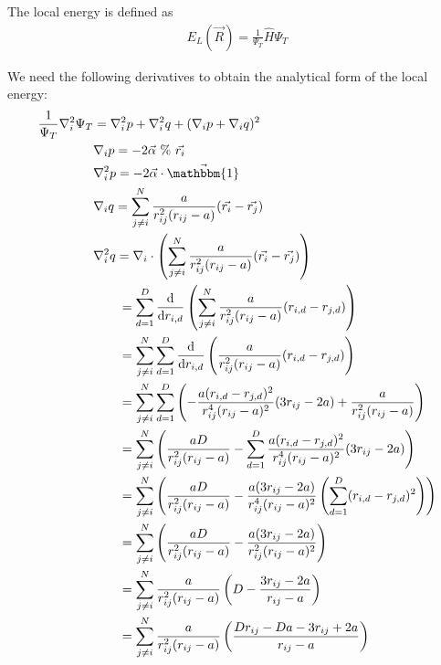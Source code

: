 \documentclass[12pt]{article}
\begin{document}
\noindent The local energy is defined as
\begin{align}
E_L(\vec{R}) = \frac{1}{\Psi_T}\hat{H}\Psi_T 
\end{align}

\noindent We need the following derivatives to obtain the analytical form of the local energy:
\begin{align*}
\frac{1}{\Psi_T}\nabla_i^2 \Psi_T &= \nabla_i^2 p + \nabla_i^2 q + (\nabla_i p + \nabla_i q)^2\\
&\nabla_i p = -2 \vec{\alpha} \ \% \ \vec{r_i}\\
&\nabla_i^2 p = -2 \vec{\alpha} \cdot \vec{\mathbbm{1}}\\
&\nabla_i q = \sum_{j \neq i}^N \frac{a}{r_{ij}^2(r_{ij}-a) }(\vec{r_i}-\vec{r_j})\\
&\nabla_i^2 q = \nabla_i \cdot \left( \sum_{j \neq i}^N \frac{a}{r_{ij}^2(r_{ij}-a)} (\vec{r_i}-\vec{r_j}) \right) \\
& \hspace*{7mm} = \sum_{d=1}^D \frac{\text{d}}{\text{d}r_{i,d}} \left( \sum_{j \neq i}^N \frac{a}{r_{ij}^2(r_{ij}-a) }(r_{i,d}-r_{j,d}) \right) \\
& \hspace*{7mm} = \sum_{j\neq i}^N \sum_{d=1}^D \frac{\text{d}}{\text{d}r_{i,d}} \left( \frac{a}{r_{ij}^2(r_{ij}-a) }(r_{i,d}-r_{j,d}) \right) \\
& \hspace*{7mm} = \sum_{j\neq i}^N \sum_{d=1}^D  \left( -\frac{a(r_{i,d}-r_{j,d})^2}{r_{ij}^4(r_{ij}-a)^2} (3r_{ij}-2a) + \frac{a}{r_{ij}^2(r_{ij}-a)}\right) \\
& \hspace*{7mm} = \sum_{j\neq i}^N \left( \frac{aD}{r_{ij}^2(r_{ij}-a)} -\sum_{d=1}^D 
\frac{a(r_{i,d}-r_{j,d})^2}{r_{ij}^4(r_{ij}-a)^2} (3r_{ij}-2a)  \right)\\
& \hspace*{7mm} = \sum_{j\neq i}^N \left( \frac{aD}{r_{ij}^2(r_{ij}-a)} -
\frac{a(3r_{ij}-2a)}{r_{ij}^4(r_{ij}-a)^2} \left(  \sum_{d=1}^D  (r_{i,d}-r_{j,d})^2 \right)  \right)\\
& \hspace*{7mm} = \sum_{j\neq i}^N \left( \frac{aD}{r_{ij}^2(r_{ij}-a)} -
\frac{a(3r_{ij}-2a)}{r_{ij}^2(r_{ij}-a)^2}  \right)\\
& \hspace*{7mm} = \sum_{j\neq i}^N \frac{a}{r_{ij}^2(r_{ij}-a)} \left( D - \frac{3r_{ij}-2a}{r_{ij}-a}   \right)\\
& \hspace*{7mm} = \sum_{j\neq i}^N \frac{a}{r_{ij}^2(r_{ij}-a)} \left( \frac{Dr_{ij}-Da -3r_{ij}+2a}{r_{ij}-a}   \right)\\

\end{align*}
\end{document}
